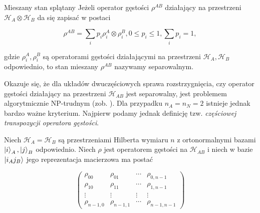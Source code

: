 \documentclass{beamer}
\begin{document}
\begin{frame}
    \begin{exampleblock}{Mieszany stan splątany}
        Jeżeli operator gęstości $\rho ^ {AB}$ działający na przestrzeni $\mathcal{H}_A \otimes \mathcal{H}_B$ da się zapisać w postaci

        $$
            \rho ^ {AB} = \sum \limits_{i} p_{i} \rho_{i}^{A} \otimes \rho_{i}^{B}, 0 \leq p_{i} \leq 1, \sum \limits_{i} p_{i} = 1,
        $$

        gdzie $\rho_{i}^{A}, \rho_{i}^{B}$ są operatorami gęstości działającymi na przestrzeni $\mathcal{H}_A, \mathcal{H}_B$ odpowiednio, to stan mieszany $\rho^{AB}$ nazywamy separowalnym.
    \end{exampleblock}
\end{frame}

\begin{frame}
    Okazuje się, że dla układów dwuczęściowych sprawa rozstrzygnięcia, czy operator gęstości działający na przestrzeni $\mathcal{H}_{AB}$ jest separowalny, jest problemem algorytmicznie NP-trudnym (zob. \cite{hor2009}). Dla przypadku $n_{A} = n_{N} = 2$ istnieje jednak bardzo ważne kryterium. Najpierw podamy jednak definicję tzw. \textit{częściowej transpozycji operatora gęstości}.
\end{frame}

\begin{frame}
    Niech $\mathcal{H}_{A} = \mathcal{H}_{B}$ są przestrzeniami Hilberta wymiaru $n$ z ortonormalnymi bazami $\ket{i}_{A}, \ket{j}_{B}$ odpowiednio. Niech $\rho$ jest operatorem gęstości na $\mathcal{H}_{AB}$ i niech w bazie $\ket{i_{A} j_{B}}$ jego reprezentacja macierzowa ma postać

    $$
        \begin{pmatrix}
            \rho_{00} & \rho_{01} & \cdots & \rho_{0, n - 1} \\
            \rho_{10} & \rho_{11} & \cdots & \rho_{1, n - 1} \\
            \vdots & \vdots & \vdots & \vdots \\
            \rho_{n - 1, 0} & \rho_{n - 1, 1} & \cdots & \rho_{n - 1, n - 1}
        \end{pmatrix}
    $$
\end{frame}
\end{document}
